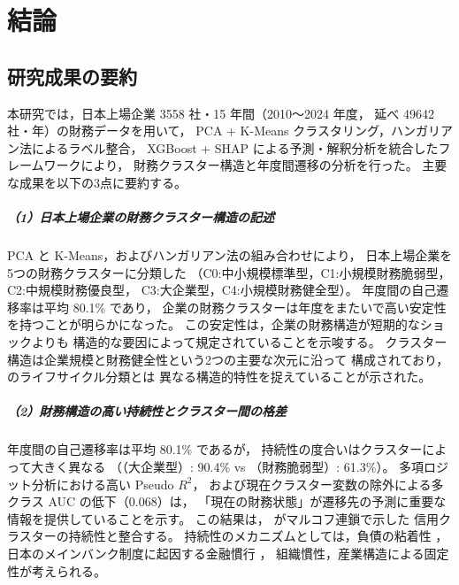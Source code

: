 \chapter{結論}
\label{chap:conclusion}

\section{研究成果の要約}
\label{sec:conclusion-summary}

本研究では，日本上場企業 \num{3558} 社・15 年間（2010〜2024 年度，
延べ \num{49642} 社・年）の財務データを用いて，
PCA + K-Means クラスタリング，ハンガリアン法によるラベル整合，
XGBoost + SHAP による予測・解釈分析を統合したフレームワークにより，
財務クラスター構造と年度間遷移の分析を行った。
主要な成果を以下の3点に要約する。

\paragraph{（1）日本上場企業の財務クラスター構造の記述}
PCA と K-Means，およびハンガリアン法の組み合わせにより，
日本上場企業を5つの財務クラスターに分類した
（C0:中小規模標準型，C1:小規模財務脆弱型，C2:中規模財務優良型，
C3:大企業型，C4:小規模財務健全型）。
年度間の自己遷移率は平均 80.1\% であり，
企業の財務クラスターは年度をまたいで高い安定性を持つことが明らかになった。
この安定性は，企業の財務構造が短期的なショックよりも
構造的な要因によって規定されていることを示唆する。
クラスター構造は企業規模と財務健全性という2つの主要な次元に沿って
構成されており， のライフサイクル分類とは
異なる構造的特性を捉えていることが示された。

\paragraph{（2）財務構造の高い持続性とクラスター間の格差}
年度間の自己遷移率は平均 80.1\% であるが，
持続性の度合いはクラスターによって大きく異なる
（（大企業型）: 90.4\% vs （財務脆弱型）: 61.3\%）。
多項ロジット分析における高い Pseudo $R^2$，
および現在クラスター変数の除外による多クラス AUC の低下（0.068）は，
「現在の財務状態」が遷移先の予測に重要な情報を提供していることを示す。
この結果は， がマルコフ連鎖で示した
信用クラスターの持続性と整合する。
持続性のメカニズムとしては，負債の粘着性 \citep{Myers1984}，
日本のメインバンク制度に起因する金融慣行 \citep{Hoshi1991, Peek2005}，
組織慣性，産業構造による固定性が考えられる。

